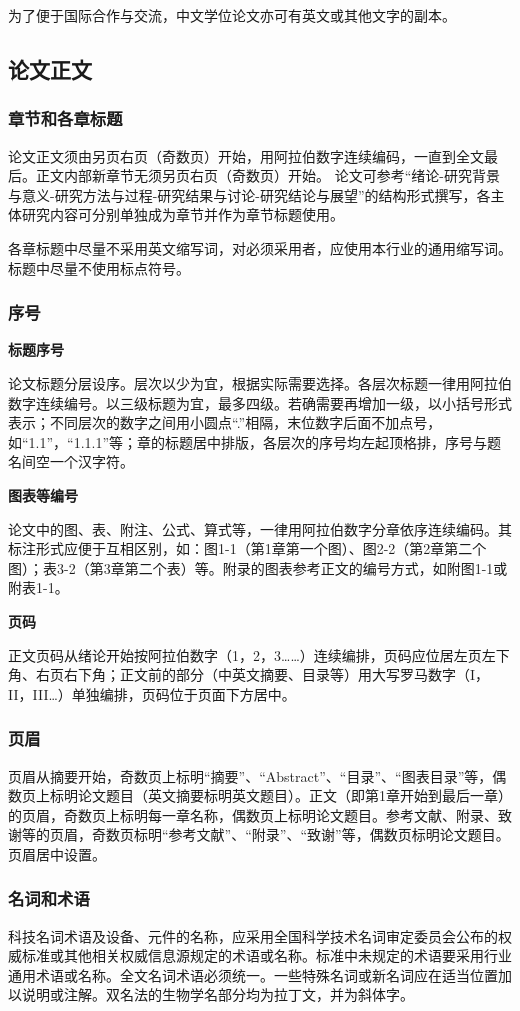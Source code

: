 {为了便于国际合作与交流，中文学位论文亦可有英文或其他文字的副本。

\subsection{论文正文}

\subsubsection{章节和各章标题}
论文正文须由另页右页（奇数页）开始，用阿拉伯数字连续编码，一直到全文最后。正文内部新章节无须另页右页（奇数页）开始。
    论文可参考“绪论-研究背景与意义-研究方法与过程-研究结果与讨论-研究结论与展望”的结构形式撰写，各主体研究内容可分别单独成为章节并作为章节标题使用。

各章标题中尽量不采用英文缩写词，对必须采用者，应使用本行业的通用缩写词。标题中尽量不使用标点符号。
\subsubsection{序号}
\textbf{标题序号}

论文标题分层设序。层次以少为宜，根据实际需要选择。各层次标题一律用阿拉伯数字连续编号。以三级标题为宜，最多四级。若确需要再增加一级，以小括号形式表示；不同层次的数字之间用小圆点“.”相隔，末位数字后面不加点号，如“1.1”，“1.1.1”等；章的标题居中排版，各层次的序号均左起顶格排，序号与题名间空一个汉字符。

\textbf{图表等编号}

论文中的图、表、附注、公式、算式等，一律用阿拉伯数字分章依序连续编码。其标注形式应便于互相区别，如：图1-1（第1章第一个图）、图2-2（第2章第二个图）；表3-2（第3章第二个表）等。附录的图表参考正文的编号方式，如附图1-1或附表1-1。

\textbf{页码}

正文页码从绪论开始按阿拉伯数字（1，2，3……）连续编排，页码应位居左页左下角、右页右下角；正文前的部分（中英文摘要、目录等）用大写罗马数字（I，II，III…）单独编排，页码位于页面下方居中。
\subsubsection{页眉}
页眉从摘要开始，奇数页上标明“摘要”、“Abstract”、“目录”、“图表目录”等，偶数页上标明论文题目（英文摘要标明英文题目）。正文（即第1章开始到最后一章）的页眉，奇数页上标明每一章名称，偶数页上标明论文题目。参考文献、附录、致谢等的页眉，奇数页标明“参考文献”、“附录”、“致谢”等，偶数页标明论文题目。页眉居中设置。

\subsubsection{名词和术语}
科技名词术语及设备、元件的名称，应采用全国科学技术名词审定委员会公布的权威标准或其他相关权威信息源规定的术语或名称。标准中未规定的术语要采用行业通用术语或名称。全文名词术语必须统一。一些特殊名词或新名词应在适当位置加以说明或注解。双名法的生物学名部分均为拉丁文，并为斜体字。

}
